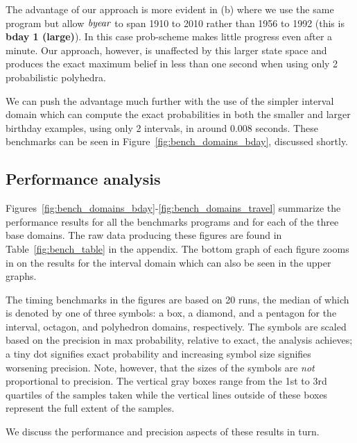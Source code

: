 The advantage of our approach is more evident in
(b) where we use the same program but allow
$\mathit{byear}$ to span 1910 to 2010 rather than 1956 to 1992 (this is
\textbf{bday 1 (large)}).  In this case prob-scheme makes little
progress even after a minute. Our approach, however, is unaffected by
this larger state space and produces the exact maximum belief in less
than one second when using only 2 probabilistic
polyhedra.

We can push the advantage much further with the use of the simpler
interval domain which can compute the exact probabilities in both the
smaller and larger birthday examples, using only 2 intervals, in
around 0.008 seconds. These benchmarks can be seen in
Figure~\ref{fig:bench_domains_bday}, discussed shortly.

\subsection{Performance analysis}
\label{sec:perf-analysis}

Figures~\ref{fig:bench_domains_bday}-\ref{fig:bench_domains_travel}
summarize the performance results for all the benchmarks programs and
for each of the three base domains. The raw data producing these
figures are found in Table~\ref{fig:bench_table} in the appendix. The
bottom graph of each figure zooms in on the results for the interval
domain which can also be seen in the upper graphs.

The timing benchmarks in the figures are based on 20 runs, the median
of which is denoted by one of three symbols: a box, a diamond, and a
pentagon for the interval, octagon, and polyhedron domains,
respectively. The symbols are scaled based on the precision in max
probability, relative to exact, the analysis achieves; a tiny dot
signifies exact probability and increasing symbol size signifies
worsening precision. Note, however, that the sizes of the symbols are
\emph{not} proportional to precision. The vertical gray boxes range from
the 1st to 3rd quartiles of the samples taken while the vertical lines
outside of these boxes represent the full extent of the samples.

We discuss the performance and precision aspects of these results in turn.


